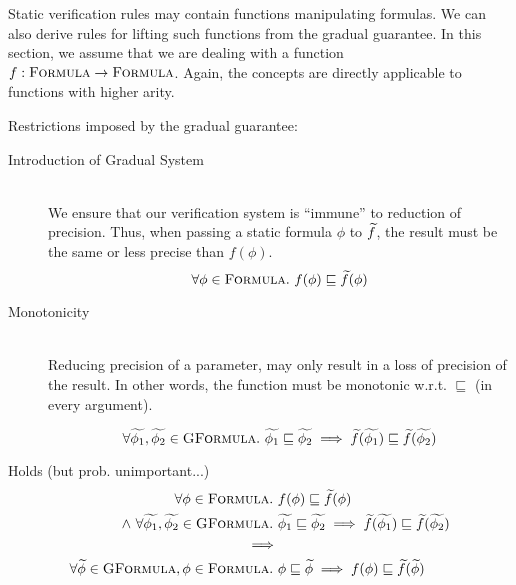 
Static verification rules may contain functions manipulating formulas. %
We can also derive rules for lifting such functions from the gradual guarantee.
In this section, we assume that we are dealing with a function $f : \textsc{Formula} \rightarrow \textsc{Formula}$.
Again, the concepts are directly applicable to functions with higher arity.

Restrictions imposed by the gradual guarantee:
\begin{description}
    \item[Introduction of Gradual System]~\\
    We ensure that our verification system is “immune” to reduction of precision.
    Thus, when passing a static formula $\phi$ to $\widetilde{f}$, the result must be the same or less precise than $f(\phi)$.
    \begin{displaymath}
    \forall \phi \in \textsc{Formula}.~ f(\phi) \sqsubseteq \widetilde{f}(\phi)
    \end{displaymath}
    
    \item[Monotonicity]~\\
    Reducing precision of a parameter, may only result in a loss of precision of the result.
    In other words, the function must be monotonic w.r.t. $\sqsubseteq$ (in every argument).
    
    \begin{displaymath}
    \forall \widetilde{\phi_1}, \widetilde{\phi_2} \in \textsc{GFormula}.~ \widetilde{\phi_1} \sqsubseteq \widetilde{\phi_2} \implies \widetilde{f}(\widetilde{\phi_1}) \sqsubseteq \widetilde{f}(\widetilde{\phi_2})
    \end{displaymath}
\end{description}


Holds (but prob. unimportant...)
\begin{align*}
\forall \phi \in \textsc{Formula}.~ &f(\phi) \sqsubseteq \widetilde{f}(\phi)\\
~\wedge~
\forall \widetilde{\phi_1}, \widetilde{\phi_2} \in \textsc{GFormula}.~ &\widetilde{\phi_1} \sqsubseteq \widetilde{\phi_2} \implies \widetilde{f}(\widetilde{\phi_1}) \sqsubseteq \widetilde{f}(\widetilde{\phi_2})\\
\implies\\
\forall \widetilde{\phi} \in \textsc{GFormula}, \phi \in \textsc{Formula}.~ &\phi \sqsubseteq \widetilde{\phi} \implies f(\phi) \sqsubseteq \widetilde{f}(\widetilde{\phi})\\
\end{align*}


